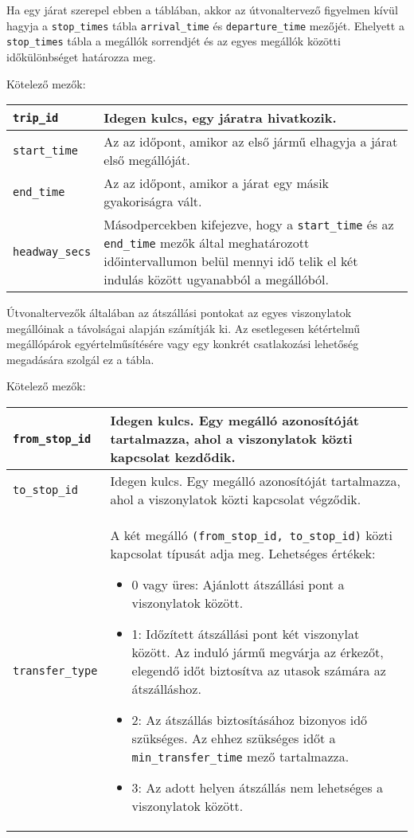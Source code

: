 
Ha egy járat szerepel ebben a táblában, akkor az útvonaltervező figyelmen kívül hagyja a \texttt{stop\_times} tábla \texttt{arrival\_time} és \texttt{departure\_time} mezőjét. Ehelyett a  \texttt{stop\_\-times} tábla a megállók sorrendjét és az egyes megállók közötti időkülönbséget határozza meg.

\medskip

\noindent Kötelező mezők:

\bigskip

\begin{tabular}{|p{3cm}|p{10cm}|}
\hline
\texttt{trip\_id} & Idegen kulcs, egy járatra hivatkozik. \\
\hline
\texttt{start\_time} & Az az időpont, amikor az első jármű elhagyja a járat első megállóját. \\
\hline
\texttt{end\_time} & Az az időpont, amikor a járat egy másik gyakoriságra vált. \\
\hline
\texttt{headway\_secs} & Másodpercekben kifejezve, hogy a \texttt{start\_time} és az \texttt{end\_time} mezők által meghatározott időintervallumon belül mennyi idő telik el két indulás között ugyanabból a megállóból. \\
\hline
\end{tabular}


Útvonaltervezők általában az átszállási pontokat az egyes viszonylatok megállóinak a távolságai alapján számítják ki. Az esetlegesen kétértelmű megállópárok egyértelműsítésére vagy egy konkrét csatlakozási lehetőség megadására szolgál ez a tábla.

\newpage

\noindent Kötelező mezők:

\bigskip

\begin{tabular}{|p{3cm}|p{10cm}|}
\hline
\texttt{from\_stop\_id} & Idegen kulcs. Egy megálló azonosítóját tartalmazza, ahol a viszonylatok közti kapcsolat kezdődik.  \\
\hline
\texttt{to\_stop\_id} & Idegen kulcs. Egy megálló azonosítóját tartalmazza, ahol a viszonylatok közti kapcsolat végződik. \\
\hline
\texttt{transfer\_type} & A két megálló \texttt{(from\_stop\_id, to\_stop\_id)} közti kapcsolat típusát adja meg.
Lehetséges értékek:
\begin{itemize}
\item 0 vagy üres: Ajánlott átszállási pont a viszonylatok között.
\item 1: Időzített átszállási pont két viszonylat között. Az induló jármű megvárja az érkezőt, elegendő időt biztosítva az utasok számára az átszálláshoz.
\item 2: Az átszállás biztosításához bizonyos idő szükséges. Az ehhez szükséges időt a \texttt{min\_transfer\_time} mező tartalmazza.
\item 3: Az adott helyen átszállás nem lehetséges a viszonylatok között.
\end{itemize}
\\
\hline
\end{tabular}

